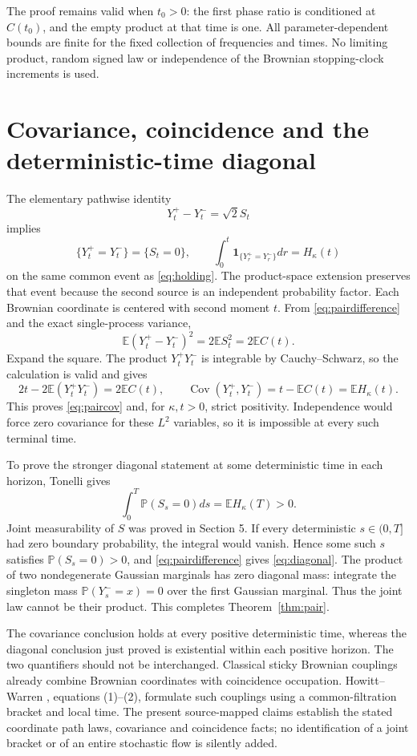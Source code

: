 \documentclass[11pt]{article}
\newcommand{\E}{\mathbb E}
\newcommand{\Pp}{\mathbb P}
\newcommand{\ind}{\mathbf1}
\begin{document}
The proof remains valid when $t_0>0$: the first phase ratio is
conditioned at $C(t_0)$, and the empty product at that time is one.
All parameter-dependent bounds are finite for the fixed collection
of frequencies and times. No limiting product, random signed law
or independence of the Brownian stopping-clock increments is used.

\section{Covariance, coincidence and the deterministic-time diagonal}
The elementary pathwise identity
\begin{equation}\label{eq:pairdifference}
 Y_t^+-Y_t^-=\sqrt2 S_t
\end{equation}
implies
\[
 \{Y_t^+=Y_t^-\}=\{S_t=0\},\qquad
 \int_0^t\ind_{\{Y_r^+=Y_r^-\}}dr=H_\kappa(t)
\]
on the same common event as \eqref{eq:holding}. The product-space
extension preserves that event because the second source is an
independent probability factor. Each Brownian coordinate is
centered with second moment $t$. From
\eqref{eq:pairdifference} and the exact single-process variance,
\[
 \E(Y_t^+-Y_t^-)^2=2\E S_t^2=2\E C(t).
\]
Expand the square. The product $Y_t^+Y_t^-$ is integrable by
Cauchy--Schwarz, so the calculation is valid and gives
\[
 2t-2\E(Y_t^+Y_t^-)=2\E C(t),\qquad
 \operatorname{Cov}(Y_t^+,Y_t^-)=t-\E C(t)=\E H_\kappa(t).
\]
This proves \eqref{eq:paircov} and, for $\kappa,t>0$, strict
positivity. Independence would force zero covariance for these
$L^2$ variables, so it is impossible at every such terminal time.

To prove the stronger diagonal statement at some deterministic
time in each horizon, Tonelli gives
\begin{equation}\label{eq:tonelliatom}
 \int_0^T\Pp(S_s=0)ds=\E H_\kappa(T)>0.
\end{equation}
Joint measurability of $S$ was proved in Section 5. If every
deterministic $s\in(0,T]$ had zero boundary probability, the integral
would vanish. Hence some such $s$ satisfies
$\Pp(S_s=0)>0$, and \eqref{eq:pairdifference} gives
\eqref{eq:diagonal}. The product of two nondegenerate Gaussian
marginals has zero diagonal mass: integrate the singleton mass
$\Pp(Y_s^-=x)=0$ over the first Gaussian marginal. Thus the
joint law cannot be their product. This completes
Theorem~\ref{thm:pair}.

The covariance conclusion holds at every positive deterministic
time, whereas the diagonal conclusion just proved is existential
within each positive horizon. The two quantifiers should not be
interchanged. Classical sticky Brownian couplings already combine
Brownian coordinates with coincidence occupation. Howitt--Warren
\cite{HW}, equations (1)--(2), formulate such couplings using a
common-filtration bracket and local time. The present source-mapped
claims establish the stated coordinate path laws, covariance and
coincidence facts; no identification of a joint bracket or of an
entire stochastic flow is silently added.
\end{document}
